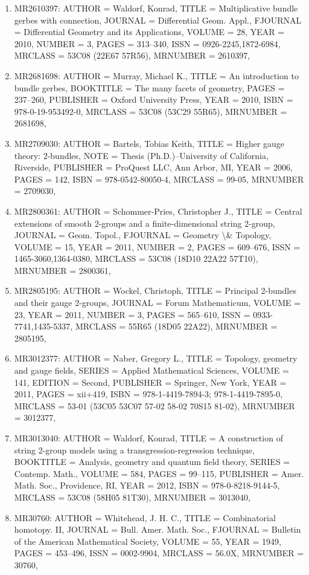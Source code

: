 \documentclass[11pt]{article}
\begin{document}
\begin{enumerate}[leftmargin=*]
  \item MR2610397: AUTHOR = Waldorf, Konrad, TITLE = Multiplicative bundle gerbes with connection, JOURNAL = Differential Geom. Appl., FJOURNAL = Differential Geometry and its Applications, VOLUME = 28, YEAR = 2010, NUMBER = 3, PAGES = 313--340, ISSN = 0926-2245,1872-6984, MRCLASS = 53C08 (22E67 57R56), MRNUMBER = 2610397,
  \item MR2681698: AUTHOR = Murray, Michael K., TITLE = An introduction to bundle gerbes, BOOKTITLE = The many facets of geometry, PAGES = 237--260, PUBLISHER = Oxford University Press, YEAR = 2010, ISBN = 978-0-19-953492-0, MRCLASS = 53C08 (53C29 55R65), MRNUMBER = 2681698,
  \item MR2709030: AUTHOR = Bartels, Tobias Keith, TITLE = Higher gauge theory: 2-bundles, NOTE = Thesis (Ph.D.)--University of California, Riverside, PUBLISHER = ProQuest LLC, Ann Arbor, MI, YEAR = 2006, PAGES = 142, ISBN = 978-0542-80050-4, MRCLASS = 99-05, MRNUMBER = 2709030,
  \item MR2800361: AUTHOR = Schommer-Pries, Christopher J., TITLE = Central extensions of smooth 2-groups and a finite-dimensional string 2-group, JOURNAL = Geom. Topol., FJOURNAL = Geometry \textbackslash{}\& Topology, VOLUME = 15, YEAR = 2011, NUMBER = 2, PAGES = 609--676, ISSN = 1465-3060,1364-0380, MRCLASS = 53C08 (18D10 22A22 57T10), MRNUMBER = 2800361,
  \item MR2805195: AUTHOR = Wockel, Christoph, TITLE = Principal 2-bundles and their gauge 2-groups, JOURNAL = Forum Mathematicum, VOLUME = 23, YEAR = 2011, NUMBER = 3, PAGES = 565--610, ISSN = 0933-7741,1435-5337, MRCLASS = 55R65 (18D05 22A22), MRNUMBER = 2805195,
  \item MR3012377: AUTHOR = Naber, Gregory L., TITLE = Topology, geometry and gauge fields, SERIES = Applied Mathematical Sciences, VOLUME = 141, EDITION = Second, PUBLISHER = Springer, New York, YEAR = 2011, PAGES = xii+419, ISBN = 978-1-4419-7894-3; 978-1-4419-7895-0, MRCLASS = 53-01 (53C05 53C07 57-02 58-02 70S15 81-02), MRNUMBER = 3012377,
  \item MR3013040: AUTHOR = Waldorf, Konrad, TITLE = A construction of string 2-group models using a transgression-regression technique, BOOKTITLE = Analysis, geometry and quantum field theory, SERIES = Contemp. Math., VOLUME = 584, PAGES = 99--115, PUBLISHER = Amer. Math. Soc., Providence, RI, YEAR = 2012, ISBN = 978-0-8218-9144-5, MRCLASS = 53C08 (58H05 81T30), MRNUMBER = 3013040,
  \item MR30760: AUTHOR = Whitehead, J. H. C., TITLE = Combinatorial homotopy. II, JOURNAL = Bull. Amer. Math. Soc., FJOURNAL = Bulletin of the American Mathematical Society, VOLUME = 55, YEAR = 1949, PAGES = 453--496, ISSN = 0002-9904, MRCLASS = 56.0X, MRNUMBER = 30760,

\end{enumerate}
\end{document}
